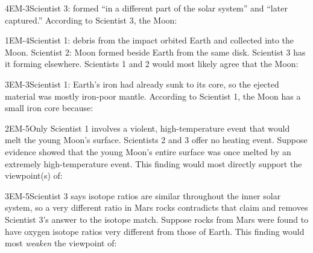 \documentclass[11pt]{article}
\begin{document}
\begin{q}{4}{EM-3}{Scientist 3: formed ``in a different part of the solar system'' and ``later captured.''}
According to Scientist 3, the Moon:
\end{q}

\begin{q}{1}{EM-4}{Scientist 1: debris from the impact orbited Earth and collected into the Moon. Scientist 2: Moon formed beside Earth from the same disk. Scientist 3 has it forming elsewhere.}
Scientists 1 and 2 would most likely agree that the Moon:
\end{q}

\begin{q}{3}{EM-3}{Scientist 1: Earth's iron had already sunk to its core, so the ejected material was mostly iron-poor mantle.}
According to Scientist 1, the Moon has a small iron core because:
\end{q}

\begin{q}{2}{EM-5}{Only Scientist 1 involves a violent, high-temperature event that would melt the young Moon's surface. Scientists 2 and 3 offer no heating event.}
Suppose evidence showed that the young Moon's entire surface was once melted by an extremely high-temperature event. This finding would most directly support the viewpoint(s) of:
\end{q}

\begin{q}{3}{EM-5}{Scientist 3 says isotope ratios are similar throughout the inner solar system, so a very different ratio in Mars rocks contradicts that claim and removes Scientist 3's answer to the isotope match.}
Suppose rocks from Mars were found to have oxygen isotope ratios very different from those of Earth. This finding would most \emph{weaken} the viewpoint of:
\end{q}
\end{document}
